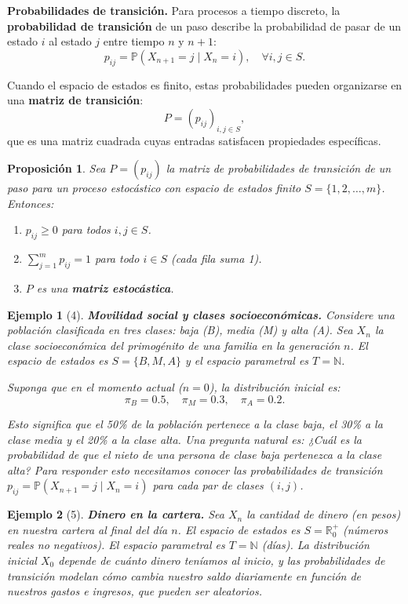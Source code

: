 \documentclass[12pt]{book}
\newtheorem{proposition}{Proposición}[chapter]
\newtheorem{example}{Ejemplo}[chapter]
\begin{document}
\textbf{Probabilidades de transición.} Para procesos a tiempo discreto, la \textbf{probabilidad de transición} de un paso describe la probabilidad de pasar de un estado $i$ al estado $j$ entre tiempo $n$ y $n+1$:
\[
p_{ij} = \mathbb{P}(X_{n+1} = j \mid X_n = i), \quad \forall i, j \in S.
\]

Cuando el espacio de estados es finito, estas probabilidades pueden organizarse en una \textbf{matriz de transición}:
\[
P = (p_{ij})_{i,j \in S},
\]
que es una matriz cuadrada cuyas entradas satisfacen propiedades específicas.

\begin{proposition}
Sea $P = (p_{ij})$ la matriz de probabilidades de transición de un paso para un proceso estocástico con espacio de estados finito $S = \{1, 2, \ldots, m\}$. Entonces:
\begin{enumerate}
    \item $p_{ij} \geq 0$ para todos $i, j \in S$.
    \item $\sum_{j=1}^m p_{ij} = 1$ para todo $i \in S$ (cada fila suma 1).
    \item $P$ es una \textbf{matriz estocástica}.
\end{enumerate}
\end{proposition}

\begin{example}[4]
\textbf{Movilidad social y clases socioeconómicas.} Considere una población clasificada en tres clases: baja (B), media (M) y alta (A). Sea $X_n$ la clase socioeconómica del primogénito de una familia en la generación $n$. El espacio de estados es $S = \{B, M, A\}$ y el espacio parametral es $T = \mathbb{N}$. 

Suponga que en el momento actual ($n = 0$), la distribución inicial es:
\[
\pi_B = 0.5, \quad \pi_M = 0.3, \quad \pi_A = 0.2.
\]

Esto significa que el 50\% de la población pertenece a la clase baja, el 30\% a la clase media y el 20\% a la clase alta. Una pregunta natural es: \textit{¿Cuál es la probabilidad de que el nieto de una persona de clase baja pertenezca a la clase alta?} Para responder esto necesitamos conocer las probabilidades de transición $p_{ij} = \mathbb{P}(X_{n+1} = j \mid X_n = i)$ para cada par de clases $(i,j)$.
\end{example}

\begin{example}[5]
\textbf{Dinero en la cartera.} Sea $X_n$ la cantidad de dinero (en pesos) en nuestra cartera al final del día $n$. El espacio de estados es $S = \mathbb{R}^+_0$ (números reales no negativos). El espacio parametral es $T = \mathbb{N}$ (días). La distribución inicial $X_0$ depende de cuánto dinero teníamos al inicio, y las probabilidades de transición modelan cómo cambia nuestro saldo diariamente en función de nuestros gastos e ingresos, que pueden ser aleatorios.
\end{example}
\end{document}
